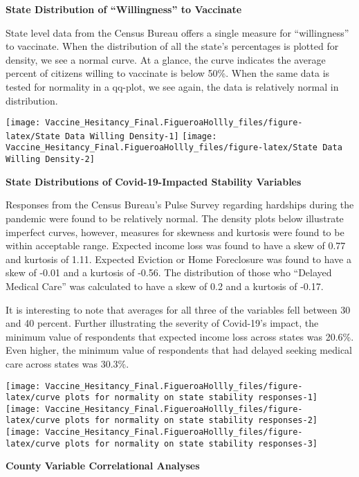 \documentclass[
]{article}
\begin{document}
\textbf{State Distribution of ``Willingness'' to Vaccinate}

State level data from the Census Bureau offers a single measure for
``willingness'' to vaccinate. When the distribution of all the state's
percentages is plotted for density, we see a normal curve. At a glance,
the curve indicates the average percent of citizens willing to vaccinate
is below 50\%. When the same data is tested for normality in a qq-plot,
we see again, the data is relatively normal in distribution. \newline

\texttt{[image: Vaccine\_Hesitancy\_Final.FigueroaHollly\_files/figure-latex/State Data Willing Density-1]}
\texttt{[image: Vaccine\_Hesitancy\_Final.FigueroaHollly\_files/figure-latex/State Data Willing Density-2]}

\textbf{State Distributions of Covid-19-Impacted Stability Variables}

Responses from the Census Bureau's Pulse Survey regarding hardships
during the pandemic were found to be relatively normal. The density
plots below illustrate imperfect curves, however, measures for skewness
and kurtosis were found to be within acceptable range. Expected income
loss was found to have a skew of 0.77 and kurtosis of 1.11. Expected
Eviction or Home Foreclosure was found to have a skew of -0.01 and a
kurtosis of -0.56. The distribution of those who ``Delayed Medical
Care'' was calculated to have a skew of 0.2 and a kurtosis of -0.17.

It is interesting to note that averages for all three of the variables
fell between 30 and 40 percent. Further illustrating the severity of
Covid-19's impact, the minimum value of respondents that expected income
loss across states was 20.6\%. Even higher, the minimum value of
respondents that had delayed seeking medical care across states was
30.3\%.

\texttt{[image: Vaccine\_Hesitancy\_Final.FigueroaHollly\_files/figure-latex/curve plots for normality on state stability responses-1]}
\texttt{[image: Vaccine\_Hesitancy\_Final.FigueroaHollly\_files/figure-latex/curve plots for normality on state stability responses-2]}
\texttt{[image: Vaccine\_Hesitancy\_Final.FigueroaHollly\_files/figure-latex/curve plots for normality on state stability responses-3]}

\textbf{County Variable Correlational Analyses}
\end{document}

